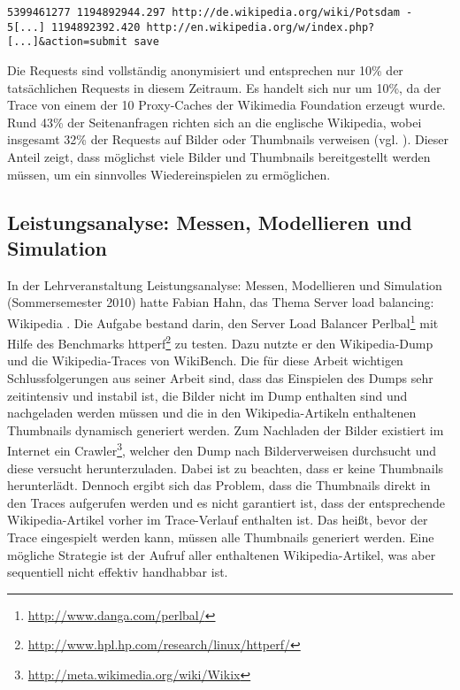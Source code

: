 \begin{small}
\begin{verbatim}
5399461277 1194892944.297 http://de.wikipedia.org/wiki/Potsdam -
5[...] 1194892392.420 http://en.wikipedia.org/w/index.php?[...]&action=submit save
\end{verbatim}
\end{small}



Die Requests sind vollständig anonymisiert und entsprechen nur 10\% der tatsächlichen Requests in diesem Zeitraum. Es handelt sich nur um 10\%, da der Trace von einem der 10 Proxy-Caches der Wikimedia Foundation erzeugt wurde. Rund 43\% der Seitenanfragen richten sich an die englische Wikipedia, wobei insgesamt 32\% der Requests auf Bilder oder Thumbnails verweisen (vgl. \cite{wikianal}). Dieser Anteil zeigt, dass möglichst viele Bilder und Thumbnails bereitgestellt werden müssen, um ein sinnvolles Wiedereinspielen zu ermöglichen.

\subsection{Leistungsanalyse: Messen, Modellieren und Simulation}
\label{sec:mms}

In der Lehrveranstaltung \glqq{}Leistungsanalyse: Messen, Modellieren und Simulation\grqq{} (Sommersemester 2010) hatte Fabian Hahn, das Thema \glqq{}Server load balancing: Wikipedia\grqq{} \cite{mms}. Die Aufgabe bestand darin, den Server Load Balancer Perlbal\footnote{\url{http://www.danga.com/perlbal/}} mit Hilfe des Benchmarks httperf\footnote{\url{http://www.hpl.hp.com/research/linux/httperf/}} zu testen. Dazu nutzte er den Wikipedia-Dump und die Wikipedia-Traces von WikiBench. Die für diese Arbeit wichtigen Schlussfolgerungen aus seiner Arbeit sind, dass das Einspielen des Dumps sehr zeitintensiv und instabil ist, die Bilder nicht im Dump enthalten sind und nachgeladen werden müssen und die in den Wikipedia-Artikeln enthaltenen Thumbnails dynamisch generiert werden. Zum Nachladen der Bilder existiert im Internet ein Crawler\footnote{\url{http://meta.wikimedia.org/wiki/Wikix}}, welcher den Dump nach Bilderverweisen durchsucht und diese versucht herunterzuladen. Dabei ist zu beachten, dass er keine Thumbnails herunterlädt. Dennoch ergibt sich das Problem, dass die Thumbnails direkt in den Traces aufgerufen werden und es nicht garantiert ist, dass der entsprechende Wikipedia-Artikel vorher im Trace-Verlauf enthalten ist. Das heißt, bevor der Trace eingespielt werden kann, müssen alle Thumbnails generiert werden. Eine mögliche Strategie ist der Aufruf aller enthaltenen Wikipedia-Artikel, was aber sequentiell nicht effektiv handhabbar ist.


